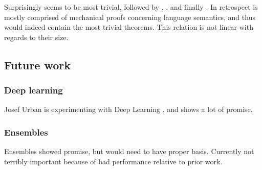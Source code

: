 Surprisingly \formalin seems to be most trivial, followed by \coq, \mathclasses, \corn and finally \mathcomp.
In retrospect \formalin is mostly comprised of mechanical proofs concerning language semantics, and thus would indeed contain the most trivial theorems.
This relation is not linear with regards to their size.

\subsection{Future work}
\subsubsection{Deep learning}
Josef Urban is experimenting with Deep Learning \cite{loos2017deep}, and shows a lot of promise.

\subsubsection{Ensembles}
Ensembles showed promise, but would need to have proper basis.
Currently not terribly important because of bad performance relative to prior work.

